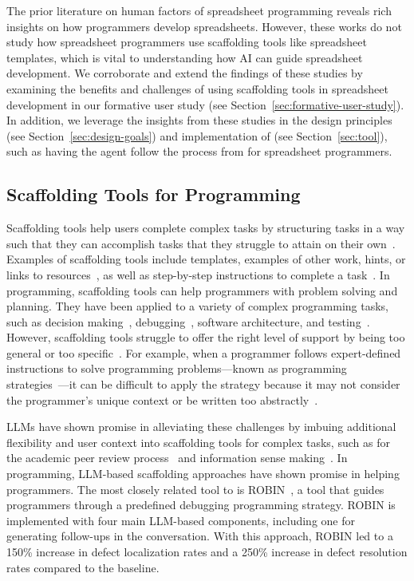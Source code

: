The prior literature on human factors of spreadsheet programming reveals rich insights on how programmers develop spreadsheets.
However, these works do not study how spreadsheet programmers use scaffolding tools like spreadsheet templates, which is vital to understanding how AI can guide spreadsheet development.
We corroborate and extend the findings of these studies by examining the benefits and challenges of using scaffolding tools in spreadsheet development in our formative user study (see Section~\ref{sec:formative-user-study}).
In addition, we leverage the insights from these studies in the design principles (see Section~\ref{sec:design-goals}) and implementation of \tool (see Section~\ref{sec:tool}),
such as having the agent follow the process from \citet{pirolli2005sensemaking} for spreadsheet programmers.

\subsection{Scaffolding Tools for Programming}
\label{sec:scaffolding-processes}
Scaffolding tools help users complete complex tasks by structuring tasks in a way such that they can accomplish tasks that they struggle to attain on their own~\cite{reiser2018scaffolding}.
Examples of scaffolding tools include templates, examples of other work, hints, or links to resources~\cite{saye2002scaffolding}, as well as step-by-step instructions to complete a task~\cite{latoza2020explicit}.
In programming, scaffolding tools can help programmers with problem solving and planning. 
They have been applied to a variety of complex programming tasks, such as decision making~\cite{liu2019unakite}, debugging~\cite{bajpai2024lets, latoza2020explicit}, software architecture, and testing~\cite{arab2021howtoo}.
However, scaffolding tools struggle to offer the right level of support by being too general or too specific~\cite{reiser2018scaffolding}.
For example, when a programmer follows expert-defined instructions to solve programming problems---known as programming strategies~\cite{latoza2020explicit}---it can be difficult to apply the strategy because it may not consider the programmer's unique context or be written too abstractly~\cite{arab2022exploratory}.

LLMs have shown promise in alleviating these challenges by imbuing additional flexibility and user context into scaffolding tools for complex tasks, such as for the academic peer review process~\cite{sun2024reviewflow} and information sense making~\cite{suh2023sensecape, liu2024selenite}.
In programming, LLM-based scaffolding approaches have shown promise in helping programmers.
The most closely related tool to \tool is ROBIN~\cite{bajpai2024lets}, a tool that guides programmers through a predefined debugging programming strategy.
ROBIN is implemented with four main LLM-based components, including one for generating follow-ups in the conversation.
With this approach, ROBIN led to a 150\% increase in defect localization rates and a 250\% increase in defect resolution rates compared to the baseline.

